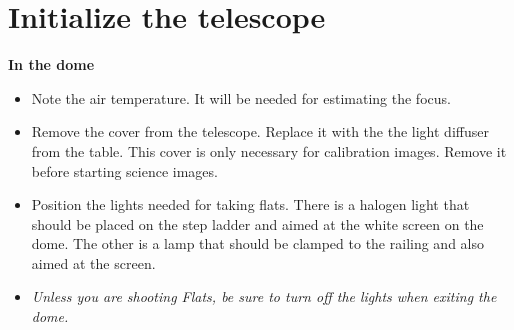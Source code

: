 \documentclass[letterpaper, 12pt]{report}
\begin{document}
\section{Initialize the telescope} 


{\large\textbf{In the dome}}
\begin{itemize}
	\item Note the air temperature. It will be needed for estimating the focus.
	\item Remove the cover from the telescope. Replace it with the the light diffuser from the table. This cover is only necessary for calibration images. Remove it before starting science images.
	\item Position the lights needed for taking flats. There is a halogen light that should be placed on the step ladder and aimed at the white screen on the dome. The other is a lamp that should be clamped to the railing and also aimed at the screen. 
	\item \emph{Unless you are shooting Flats, be sure to turn off the lights when exiting the dome.} 
\end{itemize}
\end{document}
